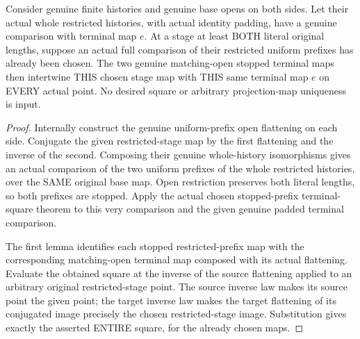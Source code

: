 \begin{theorem}
\label{hir:sharp-actual-curve-stopped-restricted-comparison-square}
\leanok
Consider genuine finite histories and genuine base opens on both sides.
Let their actual whole restricted histories, with actual identity
padding, have a genuine comparison with terminal map $e$. At a stage
at least BOTH literal original lengths, suppose an actual full
comparison of their restricted uniform prefixes has already been
chosen. The two genuine matching-open stopped terminal maps then
intertwine THIS chosen stage map with THIS same terminal map $e$
on EVERY actual point. No desired square or arbitrary projection-map
uniqueness is input.
\end{theorem}
\begin{proof}
Internally construct the genuine uniform-prefix open flattening on
each side. Conjugate the given restricted-stage map by the first
flattening and the inverse of the second. Composing their genuine
whole-history isomorphisms gives an actual comparison of the two
uniform prefixes of the whole restricted histories, over the SAME
original base map. Open restriction preserves both literal lengths,
so both prefixes are stopped. Apply the actual chosen stopped-prefix
terminal-square theorem to this very comparison and the given genuine
padded terminal comparison.

The first lemma identifies each stopped restricted-prefix map with
the corresponding matching-open terminal map composed with its
actual flattening. Evaluate the obtained square at the inverse of
the source flattening applied to an arbitrary original restricted-stage
point. The source inverse law makes its source point the given point;
the target inverse law makes the target flattening of its conjugated
image precisely the chosen restricted-stage image. Substitution gives
exactly the asserted ENTIRE square, for the already chosen maps.
\end{proof}

